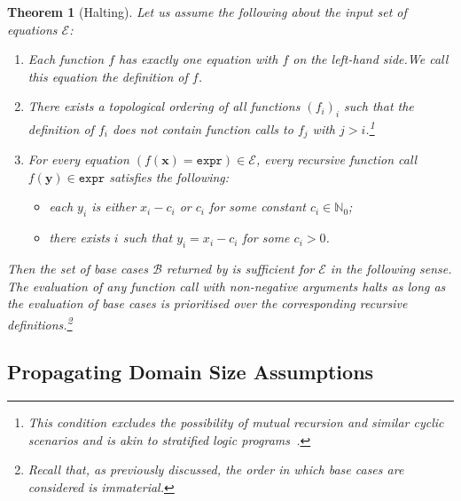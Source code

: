 \documentclass{article}
\newtheorem{theorem}{Theorem}
\theoremstyle{definition}
\newcommand{\expr}{\mathtt{expr}}
\begin{document}
\begin{theorem}[Halting]\label{thm:halting}
  Let us assume the following about the input set of equations $\mathcal{E}$:
  \begin{enumerate}
    \item Each function $f$ has exactly one equation with $f$ on the left-hand
          side.\@ We call this equation the \emph{definition} of $f$.
    \item There exists a topological ordering of all functions ${(f_{i})}_{i}$
          such that the definition of $f_{i}$ does not contain function calls to
          $f_{j}$ with $j > i$.\footnote{This condition excludes the possibility
          of mutual recursion and similar cyclic scenarios and is akin to
          stratified logic programs~\cite{DBLP:books/sp/Lloyd87}.}
    \item For every equation $(f(\mathbf{x}) = \expr) \in \mathcal{E}$, every
          recursive function call $f(\mathbf{y}) \in \expr$ satisfies the
          following:
          \begin{itemize}
            \item each $y_{i}$ is either $x_{i} - c_{i}$ or $c_{i}$ for some
                  constant $c_{i} \in \mathbb{N}_{0}$;
            \item there exists $i$ such that $y_{i} = x_{i} - c_{i}$ for some
                  $c_{i} > 0$.
          \end{itemize}
  \end{enumerate}
  Then the set of base cases $\mathcal{B}$ returned by
   is \emph{sufficient} for $\mathcal{E}$ in the
  following sense. The evaluation of any function call with non-negative
  arguments halts as long as the evaluation of base cases is prioritised over
  the corresponding recursive definitions.\footnote{Recall that, as previously
    discussed, the order in which base cases are considered is immaterial.}
\end{theorem}

\subsection{Propagating Domain Size Assumptions}\label{sec:simplifying}
\end{document}
